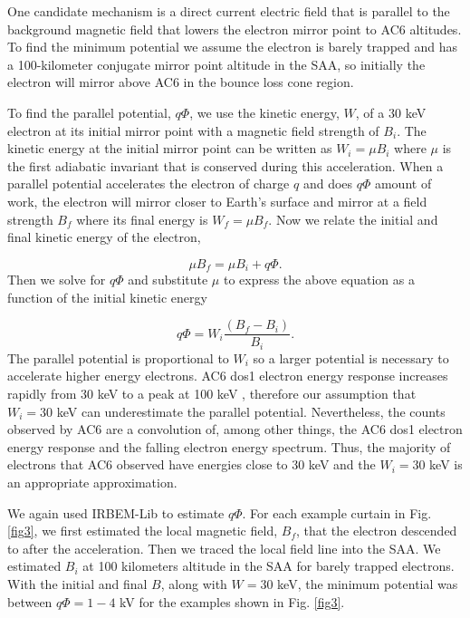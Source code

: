 \documentclass[draft]{agujournal2019}
\begin{document}
One candidate mechanism is a direct current electric field that is parallel to the background magnetic field that lowers the electron mirror point to AC6 altitudes. To find the minimum potential we assume the electron is barely trapped and has a 100-kilometer conjugate mirror point altitude in the SAA, so initially the electron will mirror above AC6 in the bounce loss cone region. 

To find the parallel potential, $q \Phi$,  we use the kinetic energy, $W$, of a $30$ keV electron at its initial mirror point with a magnetic field strength of $B_i$. The kinetic energy at the initial mirror point can be written as $W_i = \mu B_i$ where $\mu$ is the first adiabatic invariant that is conserved during this acceleration. When a parallel potential accelerates the electron of charge $q$ and does $q \Phi$ amount of work, the electron will mirror closer to Earth's surface and mirror at a field strength $B_f$ where its final energy is $W_f = \mu B_f$. Now we relate the initial and final kinetic energy of the electron,

\begin{equation}
\mu B_f = \mu B_i + q \Phi.
\end{equation} Then we solve for $q \Phi$ and substitute $\mu$ to express the above equation as a function of the initial kinetic energy 

\begin{equation}
 q \Phi = W_i \frac{(B_f - B_i)}{B_i}.
\end{equation} The parallel potential is proportional to $W_i$ so a larger potential is necessary to accelerate higher energy electrons. AC6 dos1 electron energy response increases rapidly from 30 keV to a peak at 100 keV \cite<Figure 2 in>{O'brien2019}, therefore our assumption that $W_i = 30$ keV can underestimate the parallel potential. Nevertheless, the counts observed by AC6 are a convolution of, among other things, the AC6 dos1 electron energy response and the falling electron energy spectrum. Thus, the majority of electrons that AC6 observed have energies close to 30 keV and the $W_i = 30$ keV is an appropriate approximation.

We again used IRBEM-Lib to estimate $ q \Phi$. For each example curtain in Fig. \ref{fig3}, we first estimated the local magnetic field, $B_f$, that the electron descended to after the acceleration. Then we traced the local field line into the SAA. We estimated $B_i$ at 100 kilometers altitude in the SAA for barely trapped electrons. With the initial and final $B$, along with $W = 30$ keV, the minimum potential was between $q \Phi = 1-4$ kV for the examples shown in Fig. \ref{fig3}. 
\end{document}
